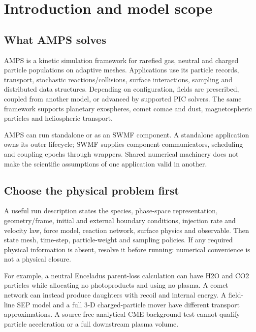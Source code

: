 \chapter{Introduction and model scope}\label{ch:introduction}
\section{What AMPS solves}
AMPS is a kinetic simulation framework for rarefied gas, neutral and charged
particle populations on adaptive meshes. Applications use its particle
records, transport, stochastic reactions/collisions, surface interactions,
sampling and distributed data structures. Depending on configuration, fields
are prescribed, coupled from another model, or advanced by supported PIC
solvers. The same framework supports planetary exospheres, comet comae and
dust, magnetospheric particles and heliospheric transport.

AMPS can run standalone or as an SWMF component. A standalone application
owns its outer lifecycle; SWMF supplies component communicators, scheduling
and coupling epochs through wrappers. Shared numerical machinery does not
make the scientific assumptions of one application valid in another.

\section{Choose the physical problem first}
A useful run description states the species, phase-space representation,
geometry/frame, initial and external boundary conditions, injection rate and
velocity law, force model, reaction network, surface physics and observable.
Then state mesh, time-step, particle-weight and sampling policies. If any
required physical information is absent, resolve it before running: numerical
convenience is not a physical closure.

For example, a neutral Enceladus parent-loss calculation can have H2O and CO2
particles while allocating no photoproducts and using no plasma. A comet
network can instead produce daughters with recoil and internal energy. A
field-line SEP model and a full 3-D charged-particle mover have different
transport approximations. A source-free analytical CME background test cannot
qualify particle acceleration or a full downstream plasma volume.

